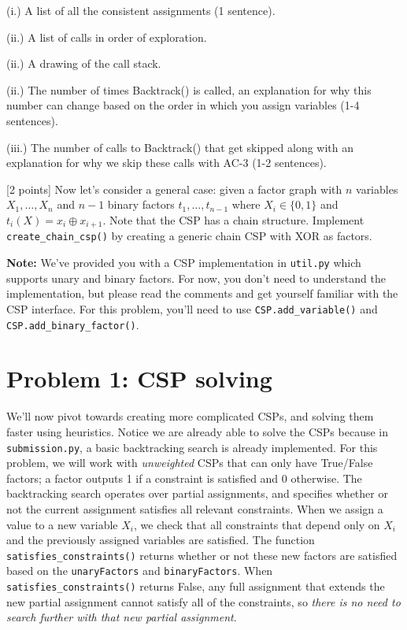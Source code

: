 \documentclass{article}
\theoremstyle{case}
\theoremstyle{definition}
\newcommand{\mysolution}[1]{\noindent{\begin{shaded}\textbf{Your Solution:}\ #1 \end{shaded}}}
\begin{document}
\begin{enumerate}[label=\alph*.]
{	(i.) A list of all the consistent assignments (1 sentence).

	(ii.) A list of calls in order of exploration.

	(ii.) A drawing of the call stack.

	(ii.) The number of times Backtrack() is called, an explanation for why this number can change based on the order in which you assign variables (1-4 sentences).

	(iii.) The number of calls to Backtrack() that get skipped along with an explanation for why we skip these calls with AC-3 (1-2 sentences).

	}
	\mysolution

\item
{[2 points]} Now let's consider a general case: given a factor graph with $n$ variables $X_1,\dots,X_n$ and $n-1$ binary factors $t_1,\dots,t_{n-1}$ where $X_i \in \{0,1\}$ and $t_i(X)=x_i\oplus x_{i+1}$. Note that the CSP has a chain structure. Implement \texttt{create\_chain\_csp()} by creating a generic chain CSP with XOR as factors.

\textbf{Note:} We've provided you with a CSP implementation in \texttt{util.py} which supports unary and binary factors. For now, you don't need to understand the implementation, but please read the comments and get yourself familiar with the CSP interface. For this problem, you'll need to use \texttt{CSP.add\_variable()} and \texttt{CSP.add\_binary\_factor()}. 
\end{enumerate}

\newpage
\section*{Problem 1: CSP solving}
We'll now pivot towards creating more complicated CSPs, and solving them faster using heuristics. Notice we are already able to solve the CSPs because in \texttt{submission.py}, a basic backtracking search is already implemented. For this problem, we will work with \textit{unweighted} CSPs that can only have True/False factors; a factor outputs 1 if a constraint is satisfied and 0 otherwise. The backtracking search operates over partial assignments, and specifies whether or not the current assignment satisfies all relevant constraints. When we assign a value to a new variable $X_i$, we check that all constraints that depend only on $X_i$ and the previously assigned variables are satisfied. The function \texttt{satisfies\_constraints()} returns whether or not these new factors are satisfied based on the \texttt{unaryFactors} and \texttt{binaryFactors}. When \texttt{satisfies\_constraints()} returns False, any full assignment that extends the new partial assignment cannot satisfy all of the constraints, so \textit{there is no need to search further with that new partial assignment}.
\end{document}
